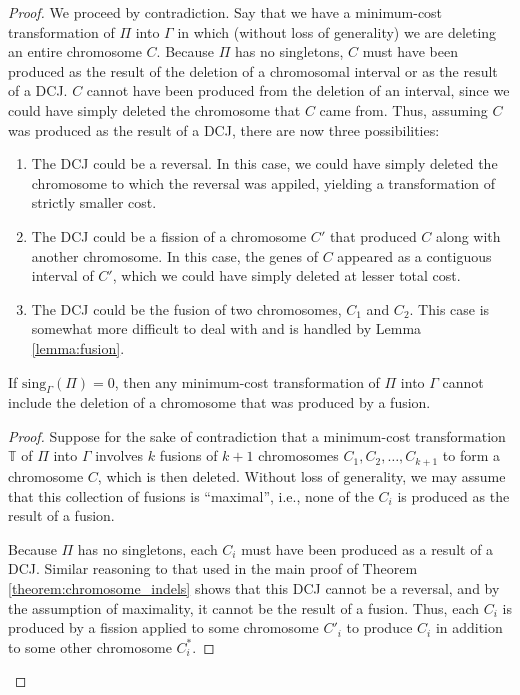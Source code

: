 \begin{proof}

We proceed by contradiction.  Say that we have a minimum-cost transformation of $\Pi$ into $\Gamma$ in which (without loss of generality) we are deleting an entire chromosome $C$.  Because $\Pi$ has no singletons, $C$ must have been produced as the result of the deletion of a chromosomal interval or as the result of a DCJ.  $C$ cannot have been produced from the deletion of an interval, since we could have simply deleted the chromosome that $C$ came from. Thus, assuming $C$ was produced as the result of a DCJ, there are now three possibilities:

\begin{enumerate}
\item The DCJ could be a reversal.  In this case, we could have simply deleted the chromosome to which the reversal was appiled, yielding a transformation of strictly smaller cost.
\item The DCJ could be a fission of a chromosome $C'$ that produced $C$ along with another chromosome.  In this case, the genes of $C$ appeared as a contiguous interval of $C'$, which we could have simply deleted at lesser total cost.
\item The DCJ could be the fusion of two chromosomes, $C_1$ and $C_2$.  This case is somewhat more difficult to deal with and is handled by Lemma \ref{lemma:fusion}.
\end{enumerate}

\begin{lemma}
If $\mathrm{sing}_{\Gamma}(\Pi) = 0$, then any minimum-cost transformation of $\Pi$ into $\Gamma$ cannot include the deletion of a chromosome that was produced by a fusion.
\label{lemma:fusion}
\end{lemma}

\begin{proof}
Suppose for the sake of contradiction that a minimum-cost transformation $\mathbb{T}$ of $\Pi$ into $\Gamma$ involves $k$ fusions of $k+1$ chromosomes $C_1, C_2, \ldots, C_{k+1}$ to form a chromosome $C$, which is then deleted.  Without loss of generality, we may assume that this collection of fusions is ``maximal'', i.e., none of the $C_i$ is produced as the result of a fusion.

Because $\Pi$ has no singletons, each $C_i$ must have been produced as a result of a DCJ.  Similar reasoning to that used in the main proof of Theorem \ref{theorem:chromosome_indels} shows that this DCJ cannot be a reversal, and by the assumption of maximality, it cannot be the result of a fusion.  Thus, each $C_i$ is produced by a fission applied to some chromosome $C'_i$ to produce $C_i$ in addition to some other chromosome $C^{*}_i$.


\end{proof}
\end{proof}
